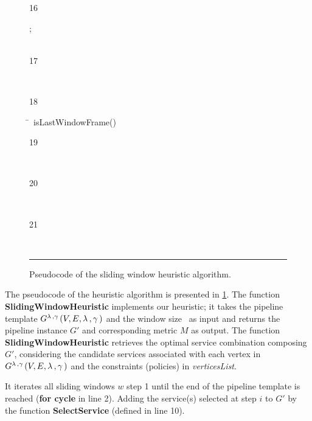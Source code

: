 \begin{figure}[!t]
\begin{tabbing}
                    \begin{redtext}16\end{redtext};\\
                    \\
                    \begin{redtext}17\end{redtext}\\
                    \begin{redtext}18\end{redtext}\=~isLastWindowFrame()\\
                    \begin{redtext}19\end{redtext}\tabone{} \bestcombination\\
                    \begin{redtext}20\end{redtext}\\
                    \begin{redtext}21\end{redtext}\tabone{} \bestcombination[0]\\



                \end{tabbing}
        \hrule
        \vspace{10pt}
        \caption{\label{fig:slidingwindow-pseudocode} Pseudocode of the sliding window heuristic algorithm.}
\end{figure}


The pseudocode of the heuristic algorithm is presented in \cref{fig:slidingwindow-pseudocode}.
The function \textbf{SlidingWindowHeuristic} implements our heuristic; it takes the pipeline template $G^{\lambda\,,\gamma\,}(V,E,\lambda\,,\gamma\,)$ and the window size \windowsize\ as input and returns the pipeline instance $G'$ and corresponding metric $M$ as output. The function \textbf{SlidingWindowHeuristic} retrieves the optimal service combination composing $G'$, considering the candidate services associated with each vertex in $G^{\lambda\,,\gamma\,}(V,E,\lambda\,,\gamma\,)$ and the constraints (policies) in \emph{verticesList}.

It iterates all sliding windows $w$ step 1 until the end of the pipeline template is reached (\textbf{for cycle} in line 2). Adding the service(s) selected at step $i$ to $G'$ by the function \textbf{SelectService} (defined in line 10).

